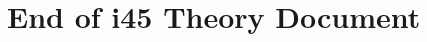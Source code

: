 \documentclass[11pt,a4paper]{article}
\begin{document}
\section*{End of i45 Theory Document}
\end{document}
